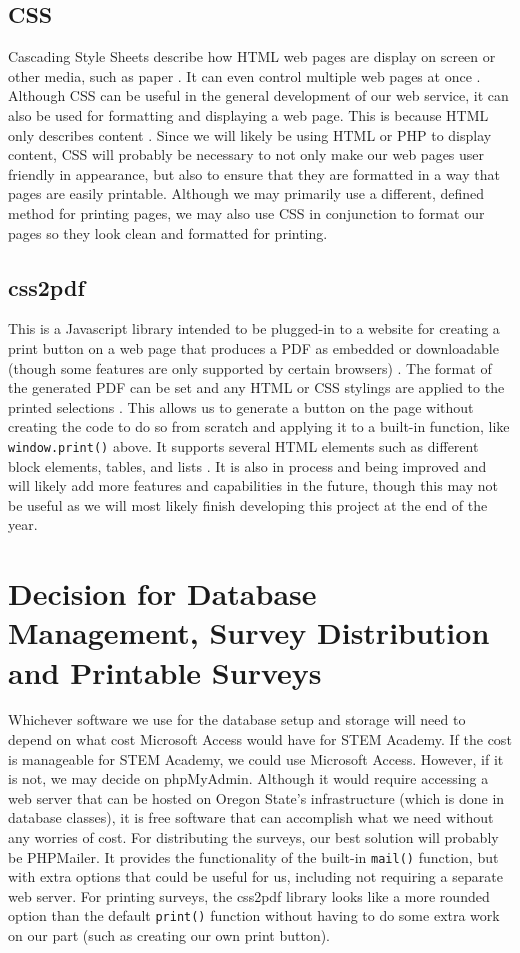 \documentclass[letterpaper,10pt,serif, draftclsnofoot,onecolumn, compsoc, titlepage]{IEEEtran}
\begin{document}
\subsection{CSS} %
Cascading Style Sheets describe how HTML web pages are display on screen or other media, such as paper \cite{css}.
It can even control multiple web pages at once \cite{css}.
Although CSS can be useful in the general development of our web service, it can also be used for formatting and displaying a web page.
This is because HTML only describes content \cite{css}.
Since we will likely be using HTML or PHP to display content, CSS will probably be necessary to not only make our web pages user friendly in appearance, but also to ensure that they are formatted in a way that pages are easily printable.
Although we may primarily use a different, defined method for printing pages, we may also use CSS in conjunction to format our pages so they look clean and formatted for printing.
\subsection{css2pdf} %
This is a Javascript library intended to be plugged-in to a website for creating a print button on a web page that produces a PDF as embedded or downloadable (though some features are only supported by certain browsers) \cite{css2pdf}.
The format of the generated PDF can be set and any HTML or CSS stylings are applied to the printed selections \cite{css2pdf}.
This allows us to generate a button on the page without creating the code to do so from scratch and applying it to a built-in function, like \texttt{window.print()} above.
It supports several HTML elements such as different block elements, tables, and lists \cite{css2pdf_home}.
It is also in process and being improved and will likely add more features and capabilities in the future, though this may not be useful as we will most likely finish developing this project at the end of the year.

\section{Decision for Database Management, Survey Distribution and Printable Surveys}
Whichever software we use for the database setup and storage will need to depend on what cost Microsoft Access would have for STEM Academy.
If the cost is manageable for STEM Academy, we could use Microsoft Access.
However, if it is not, we may decide on phpMyAdmin.
Although it would require accessing a web server that can be hosted on Oregon State's infrastructure (which is done in database classes), it is free software that can accomplish what we need without any worries of cost.
For distributing the surveys, our best solution will probably be PHPMailer.
It provides the functionality of the built-in \texttt{mail()} function, but with extra options that could be useful for us, including not requiring a separate web server.
For printing surveys, the css2pdf library looks like a more rounded option than the default \texttt{print()} function without having to do some extra work on our part (such as creating our own print button). 
\end{document}
